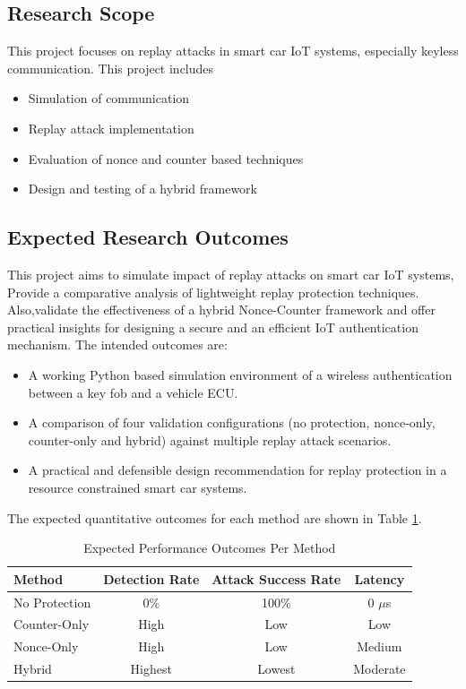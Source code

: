 \documentclass[a4paper,man,12pt]{article}
\begin{document}
\subsection{Research Scope}

This project focuses on replay attacks in smart car IoT systems, especially keyless communication.
This project includes
\begin{itemize}
  \item Simulation of communication
  \item Replay attack implementation
  \item Evaluation of nonce and counter based techniques
  \item Design and testing of a hybrid framework
\end{itemize}
  


\subsection{Expected Research Outcomes}
This project aims to simulate impact of replay attacks on smart car IoT systems, Provide a comparative analysis of lightweight replay protection techniques. Also,validate the effectiveness of a hybrid Nonce-Counter framework and offer practical insights for designing a secure and an efficient IoT authentication mechanism.  The intended outcomes are:

\begin{itemize}
  \item A working Python based simulation environment of a wireless authentication between a key fob and a vehicle ECU.
  \item A comparison of four validation configurations (no protection, nonce-only, counter-only and hybrid) against multiple replay attack scenarios.
  \item A practical and defensible design recommendation for replay protection in a resource constrained smart car systems.
\end{itemize}

The expected quantitative outcomes for each method are shown in Table \ref{tab:expected_outcomes}.

\begin{table}[H]
\centering
\caption{Expected Performance Outcomes Per Method}
\label{tab:expected_outcomes}
\begin{tabular}{|l|c|c|c|}
\hline
\textbf{Method} & \textbf{Detection Rate} & \textbf{Attack Success Rate} & \textbf{Latency} \\
\hline
No Protection   & 0\%       & 100\%     & 0 $\mu$s \\
\hline
Counter-Only    & High  & Low  & Low \\
\hline
Nonce-Only      & High & Low  & Medium \\
\hline
Hybrid          & Highest  & Lowest    & Moderate \\
\hline
\end{tabular}
\end{table}
\end{document}
